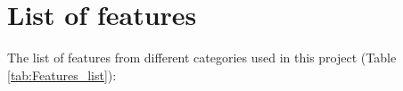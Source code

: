 \documentclass[final,twocolumn]{elsarticle}
\begin{document}
    

    

    

    
    \newpage
    


\onecolumn
\appendix
\section{List of features}
The list of features from different categories used in this project (Table \ref{tab:Features_list}):


\end{document}
